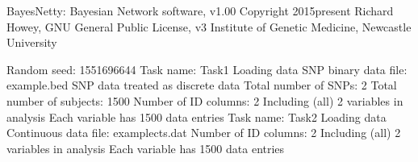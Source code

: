 \documentclass[letterpaper,10pt,english]{sphinxmanual}
\begin{document}
\begin{sphinxVerbatim}[commandchars=\\\{\}]
BayesNetty: Bayesian Network software, v1.00
\PYGZhy{}\PYGZhy{}\PYGZhy{}\PYGZhy{}\PYGZhy{}\PYGZhy{}\PYGZhy{}\PYGZhy{}\PYGZhy{}\PYGZhy{}\PYGZhy{}\PYGZhy{}\PYGZhy{}\PYGZhy{}\PYGZhy{}\PYGZhy{}\PYGZhy{}\PYGZhy{}\PYGZhy{}\PYGZhy{}\PYGZhy{}\PYGZhy{}\PYGZhy{}\PYGZhy{}\PYGZhy{}\PYGZhy{}\PYGZhy{}\PYGZhy{}\PYGZhy{}\PYGZhy{}\PYGZhy{}\PYGZhy{}\PYGZhy{}\PYGZhy{}\PYGZhy{}\PYGZhy{}\PYGZhy{}\PYGZhy{}\PYGZhy{}\PYGZhy{}\PYGZhy{}\PYGZhy{}\PYGZhy{}\PYGZhy{}\PYGZhy{}\PYGZhy{}\PYGZhy{}\PYGZhy{}\PYGZhy{}\PYGZhy{}
Copyright 2015\PYGZhy{}present Richard Howey, GNU General Public License, v3
Institute of Genetic Medicine, Newcastle University

Random seed: 1551696644
\PYGZhy{}\PYGZhy{}\PYGZhy{}\PYGZhy{}\PYGZhy{}\PYGZhy{}\PYGZhy{}\PYGZhy{}\PYGZhy{}\PYGZhy{}\PYGZhy{}\PYGZhy{}\PYGZhy{}\PYGZhy{}\PYGZhy{}\PYGZhy{}\PYGZhy{}\PYGZhy{}\PYGZhy{}\PYGZhy{}\PYGZhy{}\PYGZhy{}\PYGZhy{}\PYGZhy{}\PYGZhy{}\PYGZhy{}\PYGZhy{}\PYGZhy{}\PYGZhy{}\PYGZhy{}\PYGZhy{}\PYGZhy{}\PYGZhy{}\PYGZhy{}\PYGZhy{}\PYGZhy{}\PYGZhy{}\PYGZhy{}\PYGZhy{}\PYGZhy{}\PYGZhy{}\PYGZhy{}\PYGZhy{}\PYGZhy{}\PYGZhy{}\PYGZhy{}\PYGZhy{}\PYGZhy{}\PYGZhy{}\PYGZhy{}
Task name: Task\PYGZhy{}1
Loading data
SNP binary data file: example.bed
SNP data treated as discrete data
Total number of SNPs: 2
Total number of subjects: 1500
Number of ID columns: 2
Including (all) 2 variables in analysis
Each variable has 1500 data entries
\PYGZhy{}\PYGZhy{}\PYGZhy{}\PYGZhy{}\PYGZhy{}\PYGZhy{}\PYGZhy{}\PYGZhy{}\PYGZhy{}\PYGZhy{}\PYGZhy{}\PYGZhy{}\PYGZhy{}\PYGZhy{}\PYGZhy{}\PYGZhy{}\PYGZhy{}\PYGZhy{}\PYGZhy{}\PYGZhy{}\PYGZhy{}\PYGZhy{}\PYGZhy{}\PYGZhy{}\PYGZhy{}\PYGZhy{}\PYGZhy{}\PYGZhy{}\PYGZhy{}\PYGZhy{}\PYGZhy{}\PYGZhy{}\PYGZhy{}\PYGZhy{}\PYGZhy{}\PYGZhy{}\PYGZhy{}\PYGZhy{}\PYGZhy{}\PYGZhy{}\PYGZhy{}\PYGZhy{}\PYGZhy{}\PYGZhy{}\PYGZhy{}\PYGZhy{}\PYGZhy{}\PYGZhy{}\PYGZhy{}\PYGZhy{}
\PYGZhy{}\PYGZhy{}\PYGZhy{}\PYGZhy{}\PYGZhy{}\PYGZhy{}\PYGZhy{}\PYGZhy{}\PYGZhy{}\PYGZhy{}\PYGZhy{}\PYGZhy{}\PYGZhy{}\PYGZhy{}\PYGZhy{}\PYGZhy{}\PYGZhy{}\PYGZhy{}\PYGZhy{}\PYGZhy{}\PYGZhy{}\PYGZhy{}\PYGZhy{}\PYGZhy{}\PYGZhy{}\PYGZhy{}\PYGZhy{}\PYGZhy{}\PYGZhy{}\PYGZhy{}\PYGZhy{}\PYGZhy{}\PYGZhy{}\PYGZhy{}\PYGZhy{}\PYGZhy{}\PYGZhy{}\PYGZhy{}\PYGZhy{}\PYGZhy{}\PYGZhy{}\PYGZhy{}\PYGZhy{}\PYGZhy{}\PYGZhy{}\PYGZhy{}\PYGZhy{}\PYGZhy{}\PYGZhy{}\PYGZhy{}
Task name: Task\PYGZhy{}2
Loading data
Continuous data file: example\PYGZhy{}cts.dat
Number of ID columns: 2
Including (all) 2 variables in analysis
Each variable has 1500 data entries

\end{sphinxVerbatim}
\end{document}
